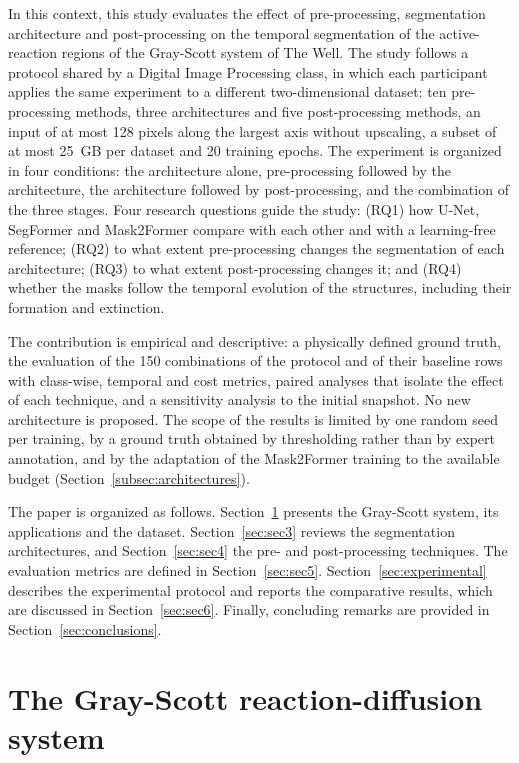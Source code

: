 \documentclass[final,5p,times,twocolumn]{elsarticle}
\begin{document}
In this context, this study evaluates the effect of pre-processing, segmentation architecture and post-processing on the temporal segmentation of the active-reaction regions of the Gray-Scott system of The Well. The study follows a protocol shared by a Digital Image Processing class, in which each participant applies the same experiment to a different two-dimensional dataset: ten pre-processing methods, three architectures and five post-processing methods, an input of at most 128 pixels along the largest axis without upscaling, a subset of at most 25~GB per dataset and 20 training epochs. The experiment is organized in four conditions: the architecture alone, pre-processing followed by the architecture, the architecture followed by post-processing, and the combination of the three stages. Four research questions guide the study: (RQ1) how U-Net, SegFormer and Mask2Former compare with each other and with a learning-free reference; (RQ2) to what extent pre-processing changes the segmentation of each architecture; (RQ3) to what extent post-processing changes it; and (RQ4) whether the masks follow the temporal evolution of the structures, including their formation and extinction.

The contribution is empirical and descriptive: a physically defined ground truth, the evaluation of the 150 combinations of the protocol and of their baseline rows with class-wise, temporal and cost metrics, paired analyses that isolate the effect of each technique, and a sensitivity analysis to the initial snapshot. No new architecture is proposed. The scope of the results is limited by one random seed per training, by a ground truth obtained by thresholding rather than by expert annotation, and by the adaptation of the Mask2Former training to the available budget (Section~\ref{subsec:architectures}).

The paper is organized as follows. Section~\ref{sec:sec2} presents the Gray-Scott system, its applications and the dataset. Section~\ref{sec:sec3} reviews the segmentation architectures, and Section~\ref{sec:sec4} the pre- and post-processing techniques. The evaluation metrics are defined in Section~\ref{sec:sec5}. Section~\ref{sec:experimental} describes the experimental protocol and reports the comparative results, which are discussed in Section~\ref{sec:sec6}. Finally, concluding remarks are provided in Section~\ref{sec:conclusions}.

\section{The Gray-Scott reaction-diffusion system}\label{sec:sec2}
\end{document}
